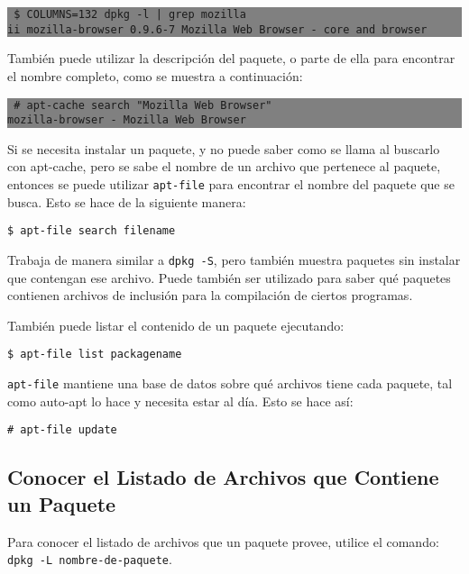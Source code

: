 \documentclass[12pt]{article}
\begin{document}
\colorbox{grey}{\parbox[t]{0.95\linewidth}{ \vspace*{0.5cm} {\tt
     \$ COLUMNS=132 dpkg -l | grep mozilla \\
     ii  mozilla-browser             0.9.6-7                     Mozilla Web Browser - core and browser \\
 } \vspace*{0.5cm} } } 

También puede utilizar la descripción del paquete, o parte de ella para encontrar el nombre completo, como se muestra a continuación:

\colorbox{grey}{\parbox[t]{0.95\linewidth}{ \vspace*{0.5cm} {\tt
     \# apt-cache search "Mozilla Web Browser" \\
     mozilla-browser - Mozilla Web Browser \\
 } \vspace*{0.5cm} } } 



Si se necesita instalar un paquete, y no puede saber como se llama al buscarlo con apt-cache, pero se sabe el nombre de un archivo que pertenece al paquete, entonces se puede utilizar \texttt{apt-file} para encontrar el nombre del paquete que se busca. Esto se hace de la siguiente manera:

{\tt     \$ apt-file search filename}

Trabaja de manera similar a \texttt{dpkg -S}, pero también muestra paquetes sin instalar que contengan ese archivo. Puede también ser utilizado para saber qué paquetes contienen archivos de inclusión para la compilación de ciertos programas.

También puede listar el contenido de un paquete ejecutando:

   {\tt  \$ apt-file list packagename}

\texttt{apt-file} mantiene una base de datos sobre qué archivos tiene cada paquete, tal como auto-apt lo hace y necesita estar al día. Esto se hace así:

     {\tt\# apt-file update}


\subsection*{Conocer el Listado de Archivos que Contiene un Paquete}


Para conocer el listado de archivos que un paquete provee, utilice el comando:
\texttt{dpkg -L nombre-de-paquete}.
\end{document}
